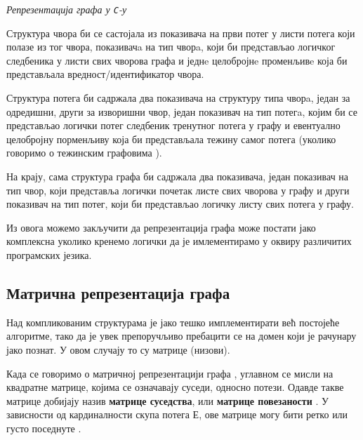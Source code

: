 \begin{listing}[!ht]
\inputminted{c}{kodovi/graph.c}
\caption{\textit{Репрезентација графа у \texttt{C}-у}}
\label{code:graph-representation}
\end{listing}

Структура чвора би се састојала из показивача на први потег у листи потега који полазе из тог чвора, показивачa на тип чворa, који би представљао логичког следбеника у листи свих чворова графа и једнe целобројнe променљивe која би представљала вредност/идентификатор чвора.

\par
Структура потега би садржала два показивача на структуру типа чворa, један за одредишни, други за изворишни чвор, један показивач на тип потегa, којим би се представљао логички потег следбеник тренутног потега у графу и евентуално целобројну порменљиву која би представљала тежину самог потега (уколико говоримо о тежинским графовима \cite{graph-cs-definition}).

\par
На крају, сама структура графа би садржала два показивача, један показивач на тип чвор, који представља логички почетак листе свих чворова у графу и други показивач на тип потег, који би представљао логичку листу свих потега у графу.

\par
Из овога можемо закључити да репрезентација графа може постати јако комплексна уколико кренемо логички да је имлементирамо у оквиру различитих програмских језика.

\subsection{Матрична репрезентација графа}
Над компликованим структурама је јако тешко имплементирати већ постојеће алгоритме, тако да је увек препоручљиво пребацити се на домен који је рачунару јако познат. У овом случају то су матрице (низови).

\par
Када се говоримо о матричној репрезентацији графа \cite{matrix-representation}, углавном се мисли на квадратне матрице, којима се означавају суседи, односно потези. Одавде такве матрице добијају назив \textbf{матрице суседства}, или \textbf{матрице повезаности} \cite{matrix-representation}. У зависности од кардиналности скупа потега $Е$, ове матрице могу бити ретко \cite{sparse-matrix} или густо поседнуте \cite{dense-matrix}. 

